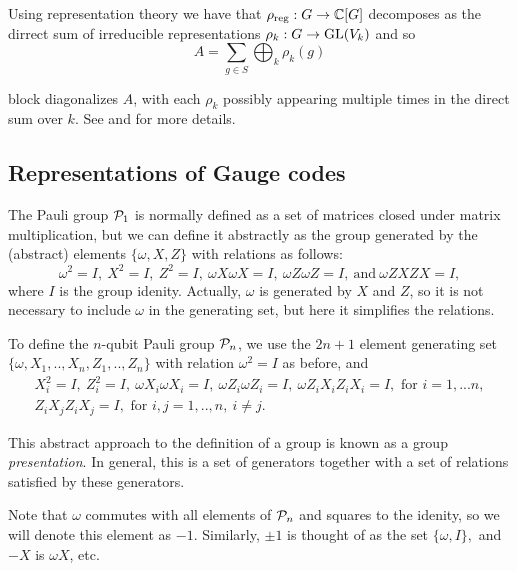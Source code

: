 \documentclass[12pt,notitlepage,longbibliography,nofootinbib,tightenlines]{revtex4}
\begin{document}
Using representation theory we have that 
$\rho_\mathrm{reg}:G\to \mathbb{C}[G]$
decomposes as the dirrect sum of irreducible
representations $\rho_k:G\to \mathrm{GL}(V_k)$
and so
$$
    A = \sum_{g\in S}\bigoplus_k \rho_k(g)
$$

block diagonalizes $A$,
with each $\rho_k$ possibly appearing multiple
times in the direct sum over $k$.
See \cite{Diaconis1981} and \cite{Kaski2002} for more details.

%
%

\subsection{Representations of Gauge codes}

The Pauli group $\mathcal{P}_1$ is normally 
defined as a set of matrices closed under
matrix multiplication, but we can define
it abstractly
as the group generated
by the (abstract) elements $\{\omega, X, Z\}$ with
relations as follows:
$$
\omega^2=I,\ X^2=I,\ Z^2=I,\ \omega X\omega X=I,\ \omega Z\omega Z=I,\ \mbox{and}\  \omega ZXZX=I,
$$
where $I$ is the group idenity.
Actually, $\omega $ is generated by $X$ and $Z$, so
it is not necessary to include $\omega $ in the generating set,
but here it simplifies the relations.

To define the $n$-qubit Pauli group $\mathcal{P}_n$, 
we use the $2n+1$ element 
generating set $\{\omega , X_1, .., X_n, Z_1, .., Z_n\}$
with relation $\omega^2=I$ as before, and
\begin{equation}\label{presentation}
\begin{array}{c}
X_i^2=I,\ Z_i^2=I,\ \omega X_i\omega X_i=I,\ \omega Z_i\omega Z_i=I,\ \omega Z_iX_iZ_iX_i=I, 
\mbox{\ for\ } i=1,...n,\\
Z_iX_jZ_iX_j=I, \mbox{\ for\ } i, j = 1,..,n,\ i\ne j.
\end{array}
\end{equation}

This abstract approach to the definition of a group is known as
a group {\it presentation}. In general, this is a set of
generators together with a set of relations satisfied
by these generators.

Note that $\omega$ commutes with all elements of $\mathcal{P}_n$
and squares to the idenity, so we will denote this
element as $-1.$ Similarly, $\pm 1$ is thought of as the
set $\{\omega, I\},$ and $-X$ is $\omega X$, etc.
\end{document}
